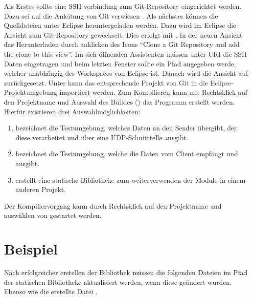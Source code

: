 Als Erstes sollte eine SSH verbindung zum Git-Repository eingerichtet werden.
Dazu sei auf die Anleitung von Git verwiesen
. Als nächstes können
die Quelldateien unter Eclipse heruntergeladen werden. Dazu wird im Eclipse die
Ansicht zum Git-Repository gewechselt. Dies erfolgt mit . In der neuen Ansicht das Herunterladen durch anklicken des
Icons "`Clone a Git Repository and add the clone to this view"'. Im sich öffnenden
Assistenten müssen unter URI die SSH-Daten
 eingetragen und
beim letzten Fenster sollte ein Pfad angegeben werde, welcher
unabhängig des Workspaces von Eclipse ist.\newline
Danach wird die Ansicht auf 
zurückgesetzt. Unter  kann das entsprechende Projekt von Git
in die Eclipse-Projektumgebung importiert werden. Zum Kompilieren kann
mit Rechtsklick auf den Projektname und Auswahl des Buildes () das Programm erstellt werden. Hierfür existieren
drei Auswahlmöglichkeiten:

\begin{enumerate}
\item {} bezeichnet die Testumgebung, welches
Daten an den Sender übergibt, der diese verarbeitet und über eine UDP-Schnitttelle ausgibt. 
\item {} bezeichnet die Testumgebung, welche die
Daten vom Client empfängt und ausgibt.
\item {} erstellt eine statische Bibliotheke zum weiterverwenden der
Module in einem anderen Projekt.
\end{enumerate}

Der Kompiliervorgang kann durch Rechtsklick auf den Projektname und auswählen
von  gestartet werden.

\section{Beispiel}

Nach erfolgreicher erstellen der Bibliothek müssen die folgenden Dateien
im Pfad  der statischen Bibliotheke aktualisiert werden,
wenn diese geändert wurden. Ebenso wie die erstellte Datei
.

